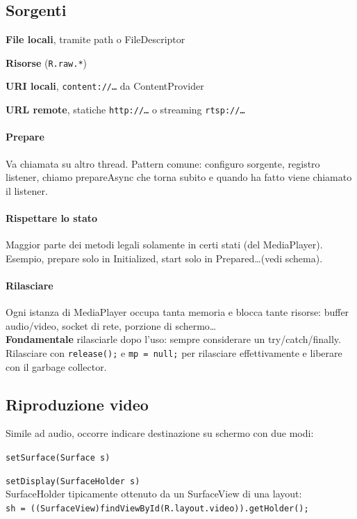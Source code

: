 \documentclass[10pt]{book}
\begin{document}
\subsection{Sorgenti}
\begin{list}{}{\textbf{Quattro tipi}}
	\item \textbf{File locali}, tramite path o FileDescriptor
	\item \textbf{Risorse} (\texttt{R.raw.*})
	\item \textbf{URI locali}, \texttt{content://\ldots} da ContentProvider
	\item \textbf{URL remote}, statiche \texttt{http://\ldots} o streaming \texttt{rtsp://\ldots}
\end{list}
\paragraph{Prepare} Va chiamata su altro thread. Pattern comune: configuro sorgente, registro listener, chiamo prepareAsync che torna subito e quando ha fatto viene chiamato il listener.
\paragraph{Rispettare lo stato} Maggior parte dei metodi legali solamente in certi stati (del MediaPlayer). Esempio, prepare solo in Initialized, start solo in Prepared\ldots (vedi schema).
\paragraph{Rilasciare} Ogni istanza di MediaPlayer occupa tanta memoria e blocca tante risorse: buffer audio/video, socket di rete, porzione di schermo\ldots\\
\textbf{Fondamentale} rilasciarle dopo l'uso: sempre considerare un try/catch/finally. Rilasciare con \texttt{release();} e \texttt{mp = null;} per rilasciare effettivamente e liberare con il garbage collector.
\subsection{Riproduzione video} Simile ad audio, occorre indicare destinazione su schermo con due modi:
\begin{list}{}{}
	\item \texttt{setSurface(Surface s)}
	\item \texttt{setDisplay(SurfaceHolder s)}\\
	SurfaceHolder tipicamente ottenuto da un SurfaceView di una layout:\\\texttt{sh = ((SurfaceView)findViewById(R.layout.video)).getHolder();}
\end{list}
\end{document}
